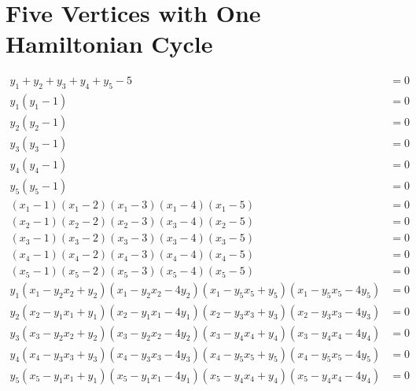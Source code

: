 \documentclass[letterpaper]{article}
\newcommand{\aln}[1]{\begin{align*} #1 \end{align*}} %
\begin{document}
\section{Five Vertices with One Hamiltonian Cycle}
\begin{center}
\end{center}
\aln{
	y_1 + y_2 + y_3 + y_4 + y_5 - 5 &= 0\\
	y_1(y_1 - 1) &= 0\\
	y_2(y_2 - 1) &= 0\\
	y_3(y_3 - 1) &= 0\\
	y_4(y_4 - 1) &= 0\\
	y_5(y_5 - 1) &= 0\\
	(x_1 - 1)(x_1 - 2)(x_1 - 3)(x_1 - 4)(x_1 - 5) &= 0\\
	(x_2 - 1)(x_2 - 2)(x_2 - 3)(x_3 - 4)(x_2 - 5) &= 0\\
	(x_3 - 1)(x_3 - 2)(x_3 - 3)(x_3 - 4)(x_3 - 5) &= 0\\
	(x_4 - 1)(x_4 - 2)(x_4 - 3)(x_4 - 4)(x_4 - 5) &= 0\\
	(x_5 - 1)(x_5 - 2)(x_5 - 3)(x_5 - 4)(x_5 - 5) &= 0\\
	y_1 (x_1 - y_2 x_2 + y_2)(x_1 - y_2 x_2 - 4y_2)(x_1 - y_5 x_5 + y_5)(x_1 - y_5 x_5 - 4y_5) &= 0\\
	y_2 (x_2 - y_1 x_1 + y_1)(x_2 - y_1 x_1 - 4y_1)(x_2 - y_3 x_3 + y_3)(x_2 - y_3 x_3 - 4y_3) &= 0\\
	y_3 (x_3 - y_2 x_2 + y_2)(x_3 - y_2 x_2 - 4y_2)(x_3 - y_4 x_4 + y_4)(x_3 - y_4 x_4 - 4y_4) &= 0\\
	y_4 (x_4 - y_3 x_3 + y_3)(x_4 - y_3 x_3 - 4y_3)(x_4 - y_5 x_5 + y_5)(x_4 - y_5 x_5 - 4y_5) &= 0\\
	y_5 (x_5 - y_1 x_1 + y_1)(x_5 - y_1 x_1 - 4y_1)(x_5 - y_4 x_4 + y_4)(x_5 - y_4 x_4 - 4y_4) &= 0
}


\newpage
\end{document}
